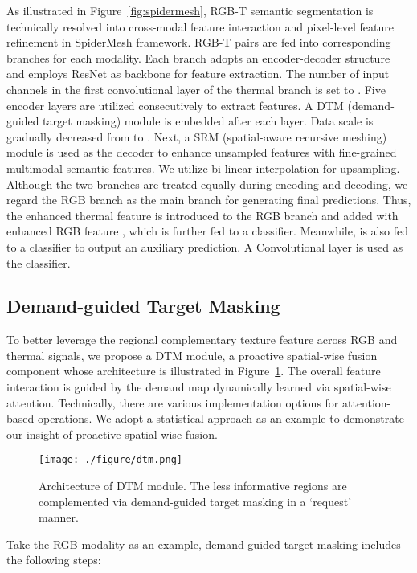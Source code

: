 \documentclass[letterpaper, 10 pt, conference]{ieeeconf}
\begin{document}
As illustrated in Figure~\ref{fig:spidermesh}, RGB-T semantic segmentation is technically resolved into cross-modal feature interaction and pixel-level feature refinement in SpiderMesh framework. RGB-T pairs are fed into corresponding branches for each modality. Each branch adopts an encoder-decoder structure and employs ResNet \cite{resnet} as backbone for feature extraction. The number of input channels in the first convolutional layer of the thermal branch is set to . Five encoder layers are utilized consecutively to extract features. A DTM (demand-guided target masking) module is embedded after each layer. Data scale is gradually decreased from  to . Next, a SRM (spatial-aware recursive meshing) module is used as the decoder to enhance unsampled features with fine-grained multimodal semantic features. We utilize bi-linear interpolation for upsampling. Although the two branches are treated equally during encoding and decoding, we regard the RGB branch as the main branch for generating final predictions. Thus, the enhanced thermal feature  is introduced to the RGB branch and added with enhanced RGB feature , which is further fed to a classifier. Meanwhile,  is also fed to a classifier to output an auxiliary prediction. A Convolutional layer is used as the classifier.

\subsection{Demand-guided Target Masking}
To better leverage the regional complementary texture feature across RGB and thermal signals, we propose a DTM module, a proactive spatial-wise fusion component whose architecture is illustrated in Figure~\ref{fig:dtm}. The overall feature interaction is guided by the demand map dynamically learned via spatial-wise attention. Technically, there are various implementation options for attention-based operations. We adopt a statistical approach \cite{cbam} as an example to demonstrate our insight of proactive spatial-wise fusion.

\begin{figure}[ht]
  \centering
  \texttt{[image: ./figure/dtm.png]}
  \caption{Architecture of DTM module. The less informative regions are complemented via demand-guided target masking in a `request' manner.}
  \label{fig:dtm}
\end{figure}

Take the RGB modality as an example, demand-guided target masking includes the following steps:
\end{document}
